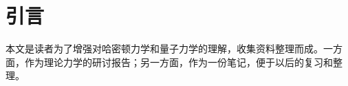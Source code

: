 \documentclass[12pt]{ctexart}
\begin{document}
\section{引言}
本文是读者为了增强对哈密顿力学和量子力学的理解，收集资料整理而成。一方面，作为理论力学的研讨报告；另一方面，作为一份笔记，便于以后的复习和整理。

\end{document}
